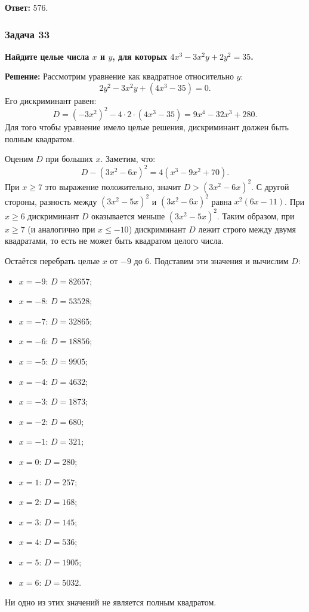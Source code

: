 \documentclass[12pt, a4paper]{article}
\begin{document}
\textbf{Ответ:} 576.

\subsubsection*{Задача 33}
\textbf{Найдите целые числа $x$ и $y$, для которых $4x^3 - 3x^2 y + 2y^2 = 35$.}

\textbf{Решение:}
Рассмотрим уравнение как квадратное относительно $y$:
\[
2y^2 - 3x^2y + (4x^3 - 35) = 0.
\]
Его дискриминант равен:
\[
D = (-3x^2)^2 - 4 \cdot 2 \cdot (4x^3 - 35) = 9x^4 - 32x^3 + 280.
\]
Для того чтобы уравнение имело целые решения, дискриминант должен быть полным квадратом.

Оценим $D$ при больших $x$. Заметим, что:
\[
D - (3x^2 - 6x)^2 = 4(x^3 - 9x^2 + 70).
\]
При $x \ge 7$ это выражение положительно, значит $D > (3x^2 - 6x)^2$.
С другой стороны, разность между $(3x^2 - 5x)^2$ и $(3x^2 - 6x)^2$ равна $x^2(6x - 11)$.
При $x \ge 6$ дискриминант $D$ оказывается меньше $(3x^2 - 5x)^2$. 
Таким образом, при $x \ge 7$ (и аналогично при $x \le -10$) дискриминант $D$ лежит строго между двумя квадратами, то есть не может быть квадратом целого числа.

Остаётся перебрать целые $x$ от $-9$ до $6$.
Подставим эти значения и вычислим $D$:
\begin{itemize}
    \item $x = -9$: $D = 82657$;
    \item $x = -8$: $D = 53528$;
    \item $x = -7$: $D = 32865$;
    \item $x = -6$: $D = 18856$;
    \item $x = -5$: $D = 9905$;
    \item $x = -4$: $D = 4632$;
    \item $x = -3$: $D = 1873$;
    \item $x = -2$: $D = 680$;
    \item $x = -1$: $D = 321$;
    \item $x = 0$: $D = 280$;
    \item $x = 1$: $D = 257$;
    \item $x = 2$: $D = 168$;
    \item $x = 3$: $D = 145$;
    \item $x = 4$: $D = 536$;
    \item $x = 5$: $D = 1905$;
    \item $x = 6$: $D = 5032$.
\end{itemize}
Ни одно из этих значений не является полным квадратом.
\end{document}
